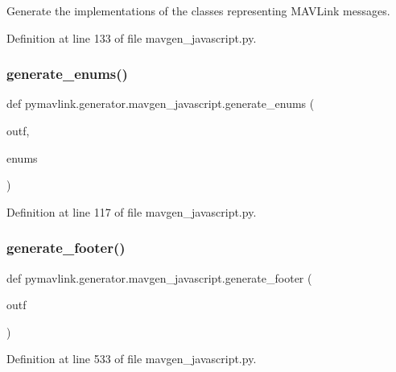 \begin{DoxyVerb}Generate the implementations of the classes representing MAVLink messages.\end{DoxyVerb}
 

Definition at line 133 of file mavgen\+\_\+javascript.\+py.

\mbox{\label{namespacepymavlink_1_1generator_1_1mavgen__javascript_aee21c87a4dc8fd18e142518307140e54}} 
\subsubsection{\texorpdfstring{generate\_enums()}{generate\_enums()}}
{\footnotesize\ttfamily def pymavlink.\+generator.\+mavgen\+\_\+javascript.\+generate\+\_\+enums (\begin{DoxyParamCaption}\item[{}]{outf,  }\item[{}]{enums }\end{DoxyParamCaption})}



Definition at line 117 of file mavgen\+\_\+javascript.\+py.

\mbox{\label{namespacepymavlink_1_1generator_1_1mavgen__javascript_a983f5d7b44460d0aa4467462f01a31cb}} 
\subsubsection{\texorpdfstring{generate\_footer()}{generate\_footer()}}
{\footnotesize\ttfamily def pymavlink.\+generator.\+mavgen\+\_\+javascript.\+generate\+\_\+footer (\begin{DoxyParamCaption}\item[{}]{outf }\end{DoxyParamCaption})}



Definition at line 533 of file mavgen\+\_\+javascript.\+py.

